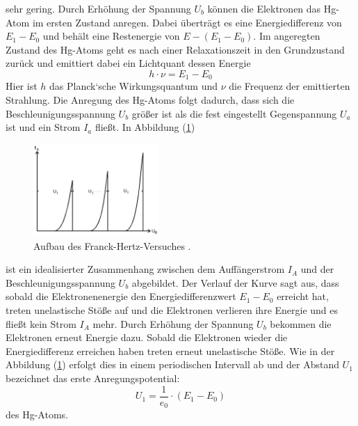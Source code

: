 sehr gering.
Durch Erhöhung der Spannung $U_b$ können die Elektronen das Hg-Atom im ersten Zustand anregen.
Dabei überträgt es eine Energiedifferenz von $E_1 - E_0$ und behält eine Restenergie von  $E -(E_1 -E_0)$.
Im angeregten Zustand des Hg-Atoms geht es nach einer Relaxationszeit in den Grundzustand zurück und
emittiert dabei ein Lichtquant dessen Energie
\begin{equation}
  h \cdot \nu = E_1 -E_0
\label{eq:3}
\end{equation}
Hier ist $h$ das Planck‘sche Wirkungsquantum und $\nu$ die Frequenz der emittierten Strahlung.
Die Anregung des Hg-Atoms folgt dadurch, dass sich die Beschleunigungsspannung $U_b$ größer ist als die
fest eingestellt Gegenspannung $U_a$ ist und ein Strom $I_a$ fließt.
In Abbildung (\ref{abb:2})
\begin{figure}[H]
\centering
\includegraphics[width =5 cm, height = 3.5cm]{content/Verlauf.jpg}
\caption{Aufbau des Franck-Hertz-Versuches \cite{1}.}
\label{abb:2}
\end{figure}
ist ein idealisierter Zusammenhang zwischen dem Auffängerstrom $I_A$ und
der Beschleunigungsspannung $U_b$ abgebildet.
Der Verlauf der Kurve sagt aus, dass sobald die Elektronenenergie den Energiedifferenzwert $E_1 - E_0$ erreicht hat, treten
unelastische Stöße auf und die Elektronen verlieren ihre Energie und es fließt kein Strom $I_A$ mehr.
Durch Erhöhung der Spannung $U_b$ bekommen die Elektronen erneut Energie dazu.
Sobald die Elektronen wieder die Energiedifferenz erreichen haben treten erneut unelastische Stöße.
Wie in der Abbildung (\ref{abb:2}) erfolgt dies in einem periodischen Intervall ab und
der Abstand $U_1$ bezeichnet das erste Anregungspotential:
\begin{equation}
  U_1 = \frac{1}{e_0} \cdot (E_1 - E_0)
  \label{eq:4}
\end{equation}
des Hg-Atoms.
